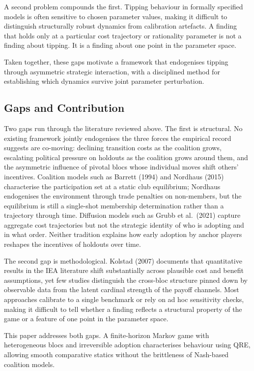 \documentclass[10pt,a4paper]{article}
\begin{document}
A second problem compounds the first. Tipping behaviour in formally specified models is often sensitive
to chosen parameter values, making it difficult to distinguish structurally robust dynamics from
calibration artefacts. A finding that holds only at a particular cost trajectory or rationality parameter is not
a finding about tipping. It is a finding about one point in the parameter space.

Taken together, these gaps motivate a framework that endogenises tipping through asymmetric strategic interaction, with a disciplined method for establishing which dynamics survive joint parameter perturbation.

\needspace{12em}
\subsection*{Gaps and Contribution}

Two gaps run through the literature reviewed above. The first is structural. No existing framework jointly
endogenises the three forces the empirical record suggests are co-moving: declining transition costs as the
coalition grows, escalating political pressure on holdouts as the coalition grows around them, and the
asymmetric influence of pivotal blocs whose individual moves shift others' incentives. Coalition models such as
Barrett (1994) and Nordhaus (2015) characterise the participation set at a static club equilibrium; Nordhaus
endogenises the environment through trade penalties on non-members, but the equilibrium is still a
single-shot membership determination rather than a trajectory through time.
Diffusion models such as Grubb et al.\ (2021) capture aggregate cost trajectories but not the strategic
identity of who is adopting and in what order. Neither tradition explains how early adoption by anchor
players reshapes the incentives of holdouts over time.

The second gap is methodological. Kolstad (2007) documents that quantitative results in the IEA literature shift substantially across plausible cost and benefit assumptions, yet few studies distinguish the cross-bloc structure pinned down by observable data from the latent cardinal strength of the payoff channels. Most approaches calibrate to a single benchmark or rely on ad hoc sensitivity checks, making it difficult to tell whether a finding reflects a structural property of the game or a feature of one point in the parameter space.

This paper addresses both gaps. A finite-horizon Markov game with heterogeneous blocs and irreversible adoption characterises behaviour using QRE, allowing smooth comparative statics without the brittleness of Nash-based coalition models.
\end{document}
